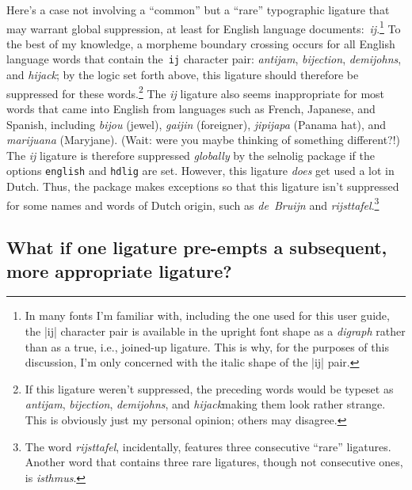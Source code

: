 \documentclass[11pt]{article}
\newcommand{\pkg}[1]{\textsf{#1}}
\newcommand{\opt}[1]{\texttt{#1}}
\begin{document}
Here's a case not involving a \enquote{common} but a \enquote{rare} typographic ligature that may warrant global suppression, at least for English language documents:~\mbox{\emph{ij}}.\footnote{In many fonts I'm familiar with, including the one used for this user guide, the |ij| character pair is available in the upright font shape as a \emph{digraph} rather than as a true, i.e., joined-up ligature. This is why, for the purposes of this discussion, I'm only concerned with the italic shape of the |ij| pair.} To the best of my knowledge, a morpheme boundary crossing occurs for all English language words that contain the~\opt{ij} character pair: \emph{antijam}, \emph{bijection}, \emph{demijohns}, and \emph{hijack}; by the logic set forth above, this ligature should therefore be suppressed for these words.\footnote{If this ligature weren't suppressed, the preceding words would be typeset as \emph{ant\mbox{ij}am}, \emph{b\mbox{ij}ection}, \emph{dem\mbox{ij}ohns}, and \emph{h\mbox{ij}ack}\textemdash making them look rather strange. This is obviously just my personal opinion; others may disagree.} The \mbox{\emph{ij}} ligature also seems inappropriate for most words that came into English from languages such as French, Japanese, and Spanish, including \emph{bijou} (jewel), \emph{gaijin} (foreigner), \emph{jipijapa} (Panama hat), and \emph{marijuana} (Maryjane). (Wait: were you maybe thinking of something different?!) The \mbox{\emph{ij}} ligature is therefore suppressed \emph{globally} by the \pkg{selnolig} package if the options \opt{english} and \opt{hdlig} are set.
However, this ligature \emph{does} get used a lot in Dutch. Thus, the package makes exceptions so that this ligature isn't suppressed for some names and words of Dutch origin, such as \emph{de~Bruijn} and \emph{rijsttafel}.\footnote{The word \emph{rijsttafel}, incidentally, features three consecutive \enquote{rare} ligatures. Another word that contains three rare ligatures, though not consecutive ones, is \emph{\mbox{is}thmus}. }



\subsection{What if one ligature pre-empts a subsequent, more appropriate ligature?} \label{sec:preempt}
\end{document}
